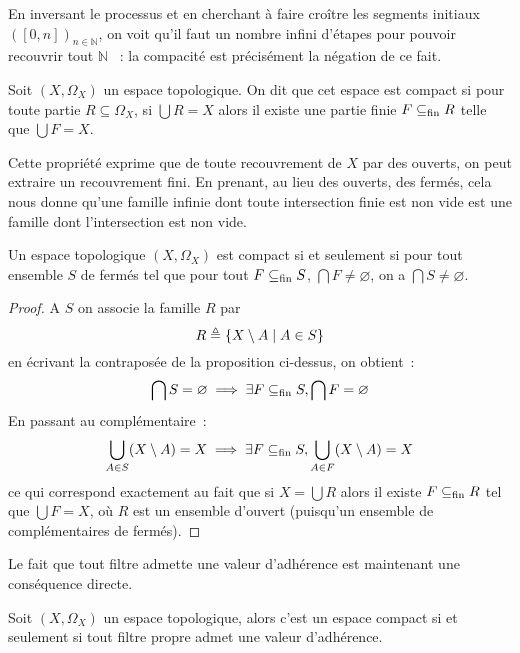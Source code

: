 En inversant le processus et en cherchant à faire croître les segments
initiaux $([0,n])_{n\in\mathbb N}$, on voit qu'il faut un nombre infini d'étapes
pour pouvoir recouvrir tout $\mathbb N$~ : la compacité est précisément la
négation de ce fait.

\begin{definition}[Compacité]
  Soit $(X,\Omega_X)$ un espace topologique. On dit que cet espace est compact
  si pour toute partie $R\subseteq \Omega_X$, si $\bigcup R = X$ alors il existe
  une partie finie $F\subseteq_{\mathrm{fin}} R$ telle que $\bigcup F = X$.
\end{definition}

Cette propriété exprime que de toute recouvrement de $X$ par des ouverts, on
peut extraire un recouvrement fini. En prenant, au lieu des ouverts, des fermés,
cela nous donne qu'une famille infinie dont toute intersection finie est non
vide est une famille dont l'intersection est non vide.

\begin{property}
  Un espace topologique $(X,\Omega_X)$ est compact si et seulement si pour tout
  ensemble $S$ de fermés tel que pour tout $F\subseteq_{\mathrm{fin}} S$,
  $\bigcap F \neq\varnothing$,
  on a $\bigcap S \neq\varnothing$.
\end{property}

\begin{proof}
  A $S$ on associe la famille $R$ par
  \[R \triangleq \{X\setminus A\mid A \in S\}\]
  en écrivant la contraposée de la proposition ci-dessus, on obtient~:
  \[\bigcap S =\varnothing\implies \exists F\subseteq_{\mathrm{fin}} S, \bigcap F = \varnothing\]
  En passant au complémentaire~:
  \[\bigcup_{A \in S}(X\setminus A) = X\implies
  \exists F\subseteq_{\mathrm{fin}} S, \bigcup_{A\in F}(X\setminus A) = X\]
  ce qui correspond exactement au fait que si $X = \bigcup R$ alors il existe
  $F\subseteq_{\mathrm{fin}} R$ tel que $\bigcup F = X$, où $R$ est un ensemble d'ouvert
  (puisqu'un ensemble de complémentaires de fermés).
\end{proof}

Le fait que tout filtre admette une valeur d'adhérence est maintenant une
conséquence directe.

\begin{proposition}
  Soit $(X,\Omega_X)$ un espace topologique, alors c'est un espace compact si
  et seulement si tout filtre propre admet une valeur d'adhérence.
\end{proposition}

